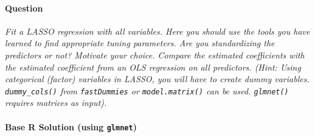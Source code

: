 \documentclass[12pt,a4paper]{article}
\newcommand{\Rpackage}[1]{\texttt{#1}} %
\newcommand{\Rfunction}[1]{\texttt{#1()}} %
\begin{document}
        \paragraph{Question}
        \textit{Fit a LASSO regression with all variables. Here you should use the tools you have learned to find appropriate tuning parameters. Are you standardizing the predictors or not? Motivate your choice. Compare the estimated coefficients with the estimated coefficient from an OLS regression on all predictors. (Hint: Using categorical (factor) variables in LASSO, you will have to create dummy variables. \Rfunction{dummy\_cols} from \Rpackage{fastDummies} or \Rfunction{model.matrix} can be used. \Rfunction{glmnet} requires matrices as input).}
        \paragraph{Base R Solution (using \Rpackage{glmnet})}
\end{document}
